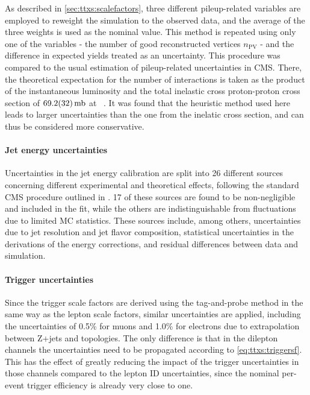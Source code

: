 As described in \cref{sec:ttxs:scalefactors}, three different pileup-related variables are employed to reweight the simulation to the observed data, and the average of the three weights is used as the nominal value. This method is repeated using only one of the variables - the number of good reconstructed vertices $n_{\mathrm{PV}}$ - and the difference in expected yields treated as an uncertainty. 
This procedure was compared to the usual estimation of pileup-related uncertainties in CMS. There, the theoretical expectation for the number of interactions %
is taken as the product of the instantaneous luminosity and the total inelastic cross proton-proton cross section of $\SI{69.2 \pm 3.2}{\milli\barn}$ at \sqrtsRII~\cite{CMS:LUM-17-003}. It was found that the heuristic method used here leads to
larger uncertainties than the one from the inelatic cross section, and can thus be considered more conservative.

\paragraph{Jet energy uncertainties}

Uncertainties in the jet energy calibration are split into 26 different sources concerning different experimental and theoretical effects, following the standard CMS procedure outlined in . 17 of these sources are found to be non-negligible and included in the fit, while the others are indistinguishable from fluctuations due to limited MC statistics. These sources include, among others, uncertainties due to jet \pt resolution and jet flavor composition, statistical uncertainties in the derivations of the energy corrections, and residual differences between data and simulation.

\paragraph{Trigger uncertainties}

Since the trigger scale factors are derived using the tag-and-probe method in the same way as the lepton scale factors, similar uncertainties are applied, including the uncertainties of 0.5\% for muons and 1.0\% for electrons due to extrapolation between Z+jets and \ttbar topologies. The only difference is that in the dilepton channels the uncertainties need to be propagated according to \cref{eq:ttxs:triggersf}. This has the effect of greatly reducing the impact of the trigger uncertainties in those channels compared to the lepton ID uncertainties, since the nominal per-event trigger efficiency is already very close to one.


